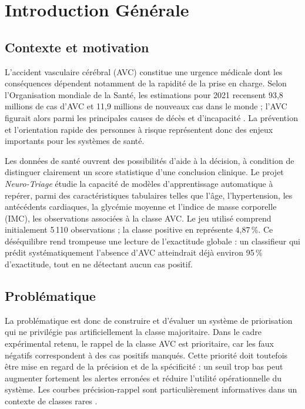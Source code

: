 \chapter*{Introduction Générale}
\vspace*{-1.1cm}
\begingroup
\footnotesize
\setlength{\parskip}{0.28em}
\setlength{\parindent}{0pt}

\section*{Contexte et motivation}
L'accident vasculaire cérébral (AVC) constitue une urgence médicale dont les conséquences dépendent notamment de la rapidité de la prise en charge. Selon l'Organisation mondiale de la Santé, les estimations pour 2021 recensent 93,8 millions de cas d'AVC et 11,9 millions de nouveaux cas dans le monde ; l'AVC figurait alors parmi les principales causes de décès et d'incapacité \cite{who_stroke_2025}. La prévention et l'orientation rapide des personnes à risque représentent donc des enjeux importants pour les systèmes de santé.

Les données de santé ouvrent des possibilités d'aide à la décision, à condition de distinguer clairement un score statistique d'une conclusion clinique. Le projet \textit{Neuro-Triage} étudie la capacité de modèles d'apprentissage automatique à repérer, parmi des caractéristiques tabulaires telles que l'âge, l'hypertension, les antécédents cardiaques, la glycémie moyenne et l'indice de masse corporelle (IMC), les observations associées à la classe AVC. Le jeu utilisé comprend initialement 5\,110 observations ; la classe positive en représente 4,87\,\%. Ce déséquilibre rend trompeuse une lecture de l'exactitude globale : un classifieur qui prédit systématiquement l'absence d'AVC atteindrait déjà environ 95\,\% d'exactitude, tout en ne détectant aucun cas positif.

\section*{Problématique}
La problématique est donc de construire et d'évaluer un système de priorisation qui ne privilégie pas artificiellement la classe majoritaire. Dans le cadre expérimental retenu, le rappel de la classe AVC est prioritaire, car les faux négatifs correspondent à des cas positifs manqués. Cette priorité doit toutefois être mise en regard de la précision et de la spécificité : un seuil trop bas peut augmenter fortement les alertes erronées et réduire l'utilité opérationnelle du système. Les courbes précision-rappel sont particulièrement informatives dans un contexte de classes rares \cite{saito2015precisionrecall}.

